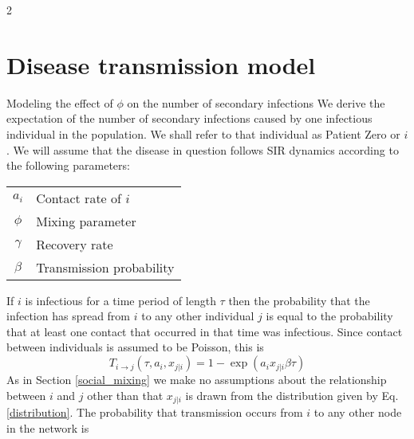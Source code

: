 \documentclass[10pt]{article}
\begin{document}
\begin{multicols}{2}

\section{Disease transmission model}
\label{disease_section}
Modeling the effect of $\phi$ on the number of secondary infections
We derive the expectation of the number of secondary infections caused by one infectious individual in the population. We shall refer to that individual as Patient Zero or $i$. We will assume that the disease in question follows SIR dynamics according to the following parameters:
\begin{center}
\begin{tabular}{c|l}
$a_{i}$& Contact rate of $i$\\
$\phi$& Mixing parameter\\
$\gamma$& Recovery rate\\
$\beta$ & Transmission probability
\end{tabular}
\end{center}
If $i$ is infectious for a time period of length $\tau$ then the probability that the infection has spread from $i$ to any other individual $j$ is equal to the probability that at least one contact that occurred in that time was infectious. Since contact between individuals is assumed to be Poisson, this is
\begin{equation}
T_{i\rightarrow j}(\tau,a_{i},x_{j|i})=1-\exp(a_{i}x_{j|i}\beta\tau) 
\end{equation}
As in Section \ref{social_mixing} we make no assumptions about the relationship between $i$ and $j$ other than that $x_{j|i}$ is drawn from the distribution given by Eq.\eqref{distribution}. The probability that transmission occurs from $i$ to any other node in the network is
\begin{equation}
\label{with_tau}
\begin{split}

\end{split}
\end{equation}
\end{multicols}
\end{document}
